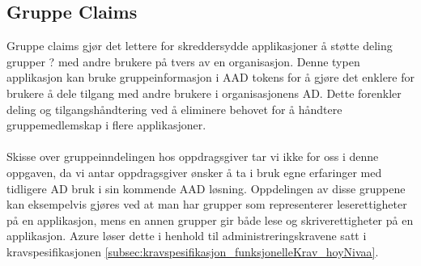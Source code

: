 \subsection*{Gruppe Claims}
Gruppe claims gjør det lettere for skreddersydde applikasjoner å støtte deling grupper{\color{blue} ?} med andre brukere på tvers av en organisasjon. Denne typen applikasjon kan bruke gruppeinformasjon i AAD tokens for å gjøre det enklere for brukere å dele tilgang med andre brukere i organisasjonens AD. Dette forenkler deling og tilgangshåndtering ved å eliminere behovet for å håndtere gruppemedlemskap i flere applikasjoner. \cite{AppRoleOgClaims} \\
\\
Skisse over gruppeinndelingen hos oppdragsgiver tar vi ikke for oss i denne oppgaven, da vi antar oppdragsgiver ønsker å ta i bruk egne erfaringer med tidligere AD bruk i sin kommende AAD løsning. Oppdelingen av disse gruppene kan eksempelvis gjøres ved at man har grupper som representerer leserettigheter på en applikasjon, mens en annen grupper gir både lese og skriverettigheter på en applikasjon. Azure løser dette i henhold til administreringskravene satt i kravspesifikasjonen \ref{subsec:kravspesifikasjon_funksjonelleKrav_hoyNivaa}.

